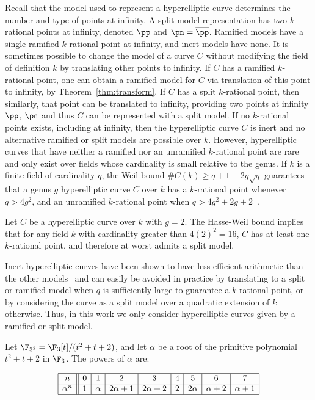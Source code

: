 Recall that the model used to represent a hyperelliptic curve determines the
number and type of points at infinity.  A split model representation has two
$k$-rational points at infinity, denoted $\pp$ and $\pn = \overline{\pp}$.
Ramified models have a single ramified $k$-rational point at infinity, and inert
models have none.  It is sometimes possible to change the model of a curve $C$
without modifying the field of definition $k$ by translating other points to
infinity. If $C$ has a ramified $k$-rational point, one can obtain a ramified
model for $C$ via translation of this point to infinity, by
Theorem~\ref{thm:transform}. If $C$ has a split $k$-rational point, then
similarly, that point can be translated to infinity, providing two points at
infinity $\pp$, $\pn$ and thus $C$ can be represented with a split model. If no
$k$-rational points exists, including at infinity, then the hyperelliptic curve
$C$ is inert and no alternative ramified or split models are possible over $k$.
However, hyperelliptic curves that have neither a ramified nor an unramified
$k$-rational point are rare and only exist over fields whose cardinality is
small relative to the genus. If $k$ is a finite field of cardinality $q$, the
Weil bound $\#C(k) \geq q + 1 - 2g \sqrt{q}$ guarantees that a genus $g$
hyperelliptic curve $C$ over $k$ has a $k$-rational point whenever $q > 4g^2$,
and an unramified $k$-rational point when $q > 4g^2 + 2g + 2$~\cite{Sutherland_g3_2019}.  

\be \label{ex:g2Weil}
Let $C$ be a hyperelliptic curve over $k$ with $g = 2$. The Hasse-Weil bound
implies that for any field $k$ with cardinality greater than $4(2)^2 = 16$, $C$
has at least one $k$-rational point, and therefore at worst admits a split
model. 
\ee

Inert hyperelliptic curves have been shown to have less efficient
arithmetic than the other models~\cite{RozenhartJacobsonScheidler_Tabulation}
and can easily be avoided in practice by translating to a
split or ramified model when $q$ is sufficiently large to guarantee a
$k$-rational point, or by considering the curve as a split model over a
quadratic extension of $k$ otherwise. Thus, in this work we only consider
hyperelliptic curves given by a ramified or split model.

\be\label{ex:quadraticext}
Let $\F_{3^2} = \F_3[t]/(t^2 + t + 2)$, and let $\alpha$ be a root of the
primitive polynomial $t^2 + t + 2$ in $\F_3$. The powers of $\alpha$ are:

\begin{table}[ht]\label{tab:f9}
\[ \begin{array}{|c||c|c|c|c|c|c|c|c|} 
  \hline
  n&0&1&2&3&4&5&6&7\\ \hline

  \alpha^n &1&\alpha&2\alpha+1&2\alpha+2&2&2\alpha&\alpha+2&\alpha+1\\  \hline
\end{array} \]
\end{table}

